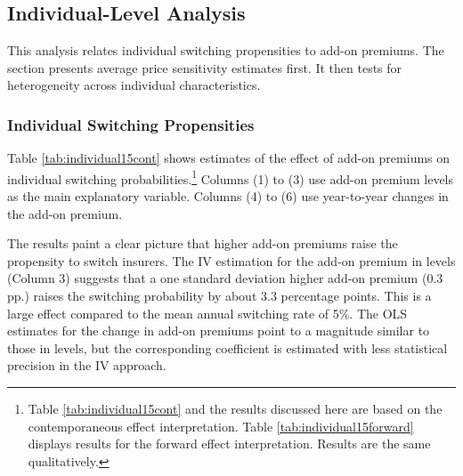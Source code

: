 \documentclass[a4paper, 11pt, english]{article}
\begin{document}


\subsection{Individual-Level Analysis \label{sec:individual_analysis}}

This analysis relates individual switching propensities to add-on premiums. The section presents average price sensitivity estimates first. It then tests for heterogeneity across individual characteristics. %

\subsubsection*{Individual Switching Propensities}

Table \ref{tab:individual15cont} shows estimates of the effect of add-on premiums on individual switching probabilities.\footnote{Table \ref{tab:individual15cont} and the results discussed here are based on the contemporaneous effect interpretation. Table \ref{tab:individual15forward} displays results for the forward effect interpretation. Results are the same qualitatively.} Columns (1) to (3) use add-on premium levels as the main explanatory variable. Columns (4) to (6) use year-to-year changes in the add-on premium. 

The results paint a clear picture that higher add-on premiums raise the propensity to switch insurers. The IV estimation for the add-on premium in levels (Column 3) suggests that a one standard deviation higher add-on premium (0.3 pp.) raises the switching probability by about 3.3 percentage points. This is a large effect compared to the mean annual switching rate of 5\%. The OLS estimates for the change in add-on premiums point to a magnitude similar to those in levels, but the corresponding coefficient is estimated with less statistical precision in the IV approach.
\end{document}
